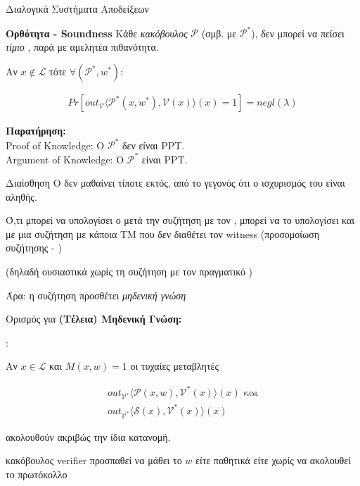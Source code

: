 \documentclass[handout]{beamer}
\begin{document}
\begin{frame}[allowframebreaks]{Διαλογικά Συστήματα Αποδείξεων}
\framebreak

\begin{block}{\textbf{Ορθότητα - Soundness}}
Κάθε \emph{κακόβουλος} $\mathcal{P}$ (σμβ. με $\mathcal{P}^*$), δεν μπορεί να πείσει \emph{τίμιο} \ver, παρά με αμελητέα πιθανότητα.

Αν $x \notin \mathcal{L}$ τότε $\forall (\mathcal{P}^*,w^*)$: 

\begin{align*}
Pr[out_{\mathcal{V}} \langle \mathcal{P}^*(x,w^*), \mathcal{V}(x) \rangle (x)=1] = negl(\lambda)
\end{align*} 
\end{block}

\textbf{Παρατήρηση: }\\
Proof of Knowledge: O $\mathcal{P}^*$ \alert{δεν} είναι PPT. \\
Argument of Knowledge: O $\mathcal{P}^*$  είναι PPT.

\framebreak

\begin{block}{Διαίσθηση}
	O \ver δεν μαθαίνει \alert{τίποτε εκτός}, από το γεγονός ότι ο ισχυρισμός του \prv είναι αληθής.
	 
	Ό,τι μπορεί να υπολογίσει ο \ver μετά την συζήτηση με τον \prv, μπορεί να το υπολογίσει και με μια συζήτηση με κάποια TM που δεν διαθέτει τον witness
	(προσομοίωση συζήτησης - \siml)
	 
	(δηλαδή ουσιαστικά χωρίς τη συζήτηση με τον πραγματικό \prv)
 
	Άρα: η συζήτηση προσθέτει \emph{μηδενική γνώση}
	
	\end{block}

\framebreak

\begin{block}{Ορισμός για \textbf{(Τέλεια) Μηδενική Γνώση:}}
 
 : 

Αν  $x \in \mathcal{L}$ και $M(x,w) = 1$ οι τυχαίες μεταβλητές 

\begin{align*}
  out_{\mathcal{V}^*}\langle \mathcal{P}(x,w), \mathcal{V}^*(x) \rangle (x)  \, \, \text{και} \\
  out_{\mathcal{V}^*}\langle \mathcal{S}(x), \mathcal{V}^*(x) \rangle(x)   
\end{align*}

ακολουθούν ακριβώς την ίδια κατανομή.
\end{block}

\alert{κακόβουλος verifier}  προσπαθεί να μάθει το $w$ είτε παθητικά είτε χωρίς να ακολουθεί το πρωτόκολλο

\framebreak


\end{frame}
\end{document}
